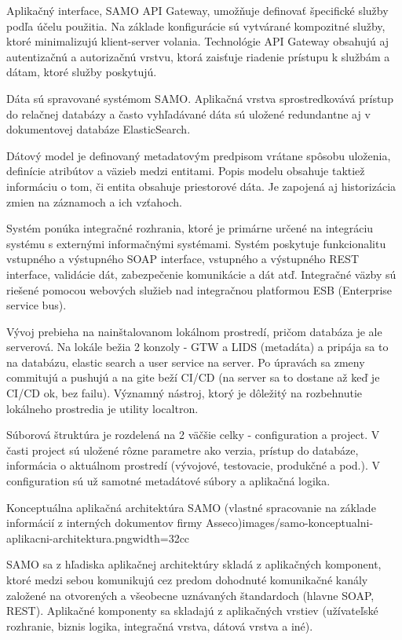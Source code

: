 Aplikačný interface, SAMO API Gateway, umožňuje definovať špecifické služby podľa účelu použitia. Na základe konfigurácie sú vytvárané kompozitné služby, ktoré minimalizujú klient-server volania. Technológie API Gateway obsahujú aj autentizačnú a autorizačnú vrstvu, ktorá zaisťuje riadenie prístupu k službám a dátam, ktoré služby poskytujú.

Dáta sú spravované systémom SAMO. Aplikačná vrstva sprostredkovává prístup do relačnej databázy a často vyhľadávané dáta sú uložené redundantne aj v dokumentovej databáze ElasticSearch. 

Dátový model je definovaný metadatovým predpisom vrátane spôsobu uloženia, definície atribútov a väzieb medzi entitami. Popis modelu obsahuje taktiež informáciu o tom, či entita obsahuje priestorové dáta. Je zapojená aj historizácia zmien na záznamoch a ich vzťahoch.

Systém ponúka integračné rozhrania, ktoré je primárne určené na integráciu systému s externými informačnými systémami. Systém poskytuje funkcionalitu vstupného a výstupného SOAP interface, vstupného a výstupného REST interface, validácie dát, zabezpečenie komunikácie a dát atď. Integračné väzby sú riešené pomocou webových služieb nad integračnou platformou ESB (Enterprise service bus). 

Vývoj prebieha na nainštalovanom lokálnom prostredí, pričom databáza je ale serverová. Na lokále bežia 2 konzoly - GTW a LIDS (metadáta) a pripája sa to na databázu, elastic search a user service na server. Po úpravách sa zmeny commitujú a pushujú a na gite beží CI/CD (na server sa to dostane až keď je CI/CD ok, bez failu). Významný nástroj, ktorý je dôležitý na rozbehnutie lokálneho prostredia je utility localtron. 

Súborová štruktúra je rozdelená na 2 väčšie celky - configuration a project. V časti project sú uložené rôzne parametre ako verzia, prístup do databáze, informácia o aktuálnom prostredí (vývojové, testovacie, produkčné a pod.). V configuration sú už samotné metadátové súbory a aplikačná logika.

{Konceptuálna aplikačná architektúra SAMO (vlastné spracovanie na základe informácií z interných dokumentov firmy Asseco)}{images/samo-konceptualni-aplikacni-architektura.png}{width=32cc}

SAMO sa z hľadiska aplikačnej architektúry skladá z aplikačných komponent, ktoré medzi sebou komunikujú cez predom dohodnuté komunikačné kanály založené na otvorených a všeobecne uznávaných štandardoch (hlavne SOAP, REST). Aplikačné komponenty sa skladajú z aplikačných vrstiev (užívateľské rozhranie, biznis logika, integračná vrstva, dátová vrstva a iné).

